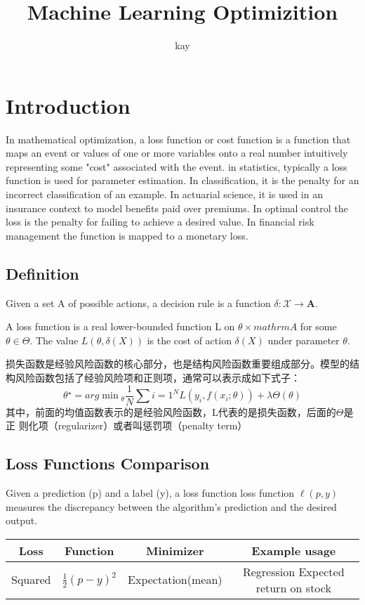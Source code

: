 \documentclass[hyperref, UTF-8]{ctexart}
\author{kay}
\title{Machine Learning Optimizition}
\begin{document}
\maketitle
\tableofcontents

\section{Introduction}
In mathematical optimization, a loss function or cost function is a function
that maps an event or values of one or more variables onto a real number
intuitively representing some "cost" associated with the event. in statistics,
typically a loss function is used for parameter estimation. In classification,
it is the penalty for an incorrect classification of an example. In actuarial
science, it is used in an insurance context to model benefits paid over
premiums. In optimal control the loss is the penalty for failing to achieve a
desired value. In financial risk management the function is mapped to a monetary
loss.\cite{lfwiki} 
\subsection{Definition}
Given a set A of possible actions, a decision rule is a function $\delta : \mathcal{X} \rightarrow \mathbf{A}$.

A loss function is a real lower-bounded function L on $\theta \times mathrm{A}$
for some $\theta \in \Theta$. The value $L(\theta, \delta(X))$ is the cost of
action $\delta{(\mathit{X})}$ under parameter $\theta$. 

损失函数是经验风险函数的核心部分，也是结构风险函数重要组成部分。模型的结构风险函数包括了经验风险项和正则项，通常可以表示成如下式子：
\begin{displaymath}
  \theta{^\star} = arg \min{_\theta} \frac{1}{N}\sum{i=1}^N \mathit{L} (y_i,
  f(x_i; \theta)) + \lambda \Theta(\theta)
\end{displaymath}
其中，前面的均值函数表示的是经验风险函数，L代表的是损失函数，后面的$\Theta$是正
则化项（regularizer）或者叫惩罚项（penalty term）

\subsection{Loss Functions Comparison}
Given a prediction (p) and a label (y), a loss function loss function
$\ell(p,y)$ measures the discrepancy between the algorithm's prediction and the
desired output.   \\
\begin{tabular}{|c|c|c|c|}
  \hline
  Loss & Function & Minimizer & Example usage \\ \hline
  Squared & $\frac{1}{2}(p-y)^2$ & Expectation(mean) & Regression Expected return on stock \\  \hline
\end{tabular}
\end{document}
